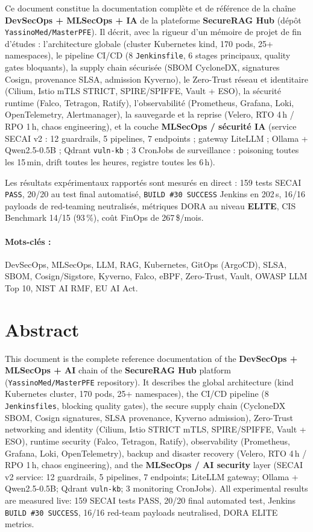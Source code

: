 \documentclass[12pt,a4paper,openany]{report}
\begin{document}
Ce document constitue la documentation complète et de référence de la chaîne
\textbf{DevSecOps + MLSecOps + IA} de la plateforme \textbf{SecureRAG Hub}
(dépôt \texttt{YassinoMed/MasterPFE}).
Il décrit, avec la rigueur d'un mémoire de projet de fin d'études :
l'architecture globale (cluster Kubernetes kind, 170 pods, 25+ namespaces),
le pipeline CI/CD (8 \texttt{Jenkinsfile}, 6 stages principaux, quality gates bloquants),
la supply chain sécurisée (SBOM CycloneDX, signatures Cosign, provenance SLSA, admission Kyverno),
le Zero-Trust réseau et identitaire (Cilium, Istio mTLS STRICT, SPIRE/SPIFFE, Vault + ESO),
la sécurité runtime (Falco, Tetragon, Ratify),
l'observabilité (Prometheus, Grafana, Loki, OpenTelemetry, Alertmanager),
la sauvegarde et la reprise (Velero, RTO 4\,h / RPO 1\,h, chaos engineering),
et la couche \textbf{MLSecOps / sécurité IA} (service SECAI v2 : 12 guardrails, 5 pipelines, 7 endpoints ;
gateway LiteLLM ; Ollama + Qwen2.5-0.5B ; Qdrant \texttt{vuln-kb} ;
3 CronJobs de surveillance : poisoning toutes les 15\,min, drift toutes les heures, registre toutes les 6\,h).

Les résultats expérimentaux rapportés sont mesurés en direct :
159 tests SECAI \texttt{PASS}, 20/20 au test final automatisé,
\texttt{BUILD \#30 SUCCESS} Jenkins en 202\,s,
16/16 payloads de red-teaming neutralisés,
métriques DORA au niveau \textbf{ELITE}, CIS Benchmark 14/15 (93\,\%),
coût FinOps de 267\,\$/mois.

\paragraph{Mots-clés :} DevSecOps, MLSecOps, LLM, RAG, Kubernetes, GitOps (ArgoCD),
SLSA, SBOM, Cosign/Sigstore, Kyverno, Falco, eBPF, Zero-Trust, Vault, OWASP LLM Top 10,
NIST AI RMF, EU AI Act.

\section*{Abstract}

This document is the complete reference documentation of the
\textbf{DevSecOps + MLSecOps + AI} chain of the \textbf{SecureRAG Hub} platform
(\texttt{YassinoMed/MasterPFE} repository).
It describes the global architecture (kind Kubernetes cluster, 170 pods, 25+ namespaces),
the CI/CD pipeline (8 \texttt{Jenkinsfiles}, blocking quality gates),
the secure supply chain (CycloneDX SBOM, Cosign signatures, SLSA provenance, Kyverno admission),
Zero-Trust networking and identity (Cilium, Istio STRICT mTLS, SPIRE/SPIFFE, Vault + ESO),
runtime security (Falco, Tetragon, Ratify),
observability (Prometheus, Grafana, Loki, OpenTelemetry),
backup and disaster recovery (Velero, RTO 4\,h / RPO 1\,h, chaos engineering),
and the \textbf{MLSecOps / AI security} layer (SECAI v2 service: 12 guardrails, 5 pipelines, 7 endpoints;
LiteLLM gateway; Ollama + Qwen2.5-0.5B; Qdrant \texttt{vuln-kb}; 3 monitoring CronJobs).
All experimental results are measured live: 159 SECAI tests PASS, 20/20 final automated test,
Jenkins \texttt{BUILD \#30 SUCCESS}, 16/16 red-team payloads neutralised, DORA ELITE metrics.
\end{document}
